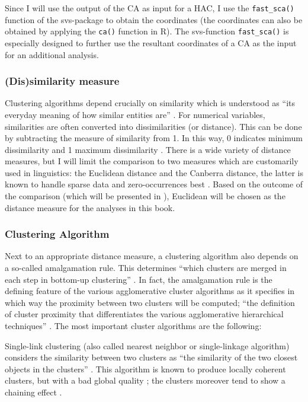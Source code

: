 Since I will use the output of the CA as input for a HAC, I use the \texttt{fast\_sca()} function of the svs{}-package to obtain the coordinates (the coordinates can also be obtained by applying the \texttt{ca()} function in R). The svs{}-function \texttt{fast\_sca()} is especially designed to further use the resultant coordinates of a CA as the input for an additional analysis.

\subsubsection{(Dis)similarity measure}
\label{sec:3.7.2.1}
Clustering algorithms depend crucially on similarity which is understood as “its everyday meaning of how similar entities are” \citep[411]{glynn_cluster_2014}. For numerical variables, similarities are often converted into dissimilarities (or distance). This can be done by subtracting the measure of similarity from 1. In this way, 0 indicates minimum dissimilarity and 1 maximum dissimilarity \citep[415--416]{glynn_cluster_2014}. There is a wide variety of distance measures, but I will limit the comparison to two measures which are customarily used in linguistics: the Euclidean distance and the Canberra distance, the latter is known to handle sparse data and zero-occurrences best \citep[132]{divjak_structuring_2010}. Based on the outcome of the comparison (which will be presented in ), Euclidean will be chosen as the distance measure for the analyses in this book.

\subsubsection{Clustering Algorithm}
\label{sec:3.7.2.2}  
Next to an appropriate distance measure, a clustering algorithm also depends on a so-called amalgamation rule. This determines “which clusters are merged in each step in bottom-up clustering” \citep[503]{manning_foundations_1999}. In fact, the amalgamation rule is the defining feature of the various agglomerative cluster algorithms as it specifies in which way the proximity between two clusters will be computed; “the definition of cluster proximity that differentiates the various agglomerative hierarchical techniques” \citep[517]{tan_introduction_2006}. The most important cluster algorithms are the following:

Single-link clustering (also called nearest neighbor or single-linkage algorithm) considers the similarity between two clusters as “the similarity of the two closest objects in the clusters” \citep[503]{manning_foundations_1999}. This algorithm is known to produce locally coherent clusters, but with a bad global quality \citep[503]{manning_foundations_1999}; the clusters moreover tend to show a chaining effect \citep[504]{manning_foundations_1999}.

